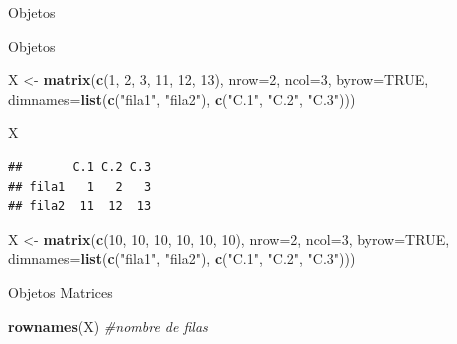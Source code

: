 \documentclass[
  ignorenonframetext,
]{beamer}
\newenvironment{Shaded}{\begin{snugshade}}{\end{snugshade}}
\newcommand{\AttributeTok}[1]{\textcolor[rgb]{0.13,0.29,0.53}{#1}}
\newcommand{\CommentTok}[1]{\textcolor[rgb]{0.56,0.35,0.01}{\textit{#1}}}
\newcommand{\ConstantTok}[1]{\textcolor[rgb]{0.56,0.35,0.01}{#1}}
\newcommand{\DecValTok}[1]{\textcolor[rgb]{0.00,0.00,0.81}{#1}}
\newcommand{\FunctionTok}[1]{\textcolor[rgb]{0.13,0.29,0.53}{\textbf{#1}}}
\newcommand{\NormalTok}[1]{#1}
\newcommand{\OtherTok}[1]{\textcolor[rgb]{0.56,0.35,0.01}{#1}}
\newcommand{\StringTok}[1]{\textcolor[rgb]{0.31,0.60,0.02}{#1}}
\begin{document}
\begin{frame}[fragile]{Objetos}
\begin{block}{Objetos}
\begin{Shaded}
\begin{Highlighting}[]
\NormalTok{X }\OtherTok{\textless{}{-}} \FunctionTok{matrix}\NormalTok{(}\FunctionTok{c}\NormalTok{(}\DecValTok{1}\NormalTok{, }\DecValTok{2}\NormalTok{, }\DecValTok{3}\NormalTok{, }\DecValTok{11}\NormalTok{, }\DecValTok{12}\NormalTok{, }\DecValTok{13}\NormalTok{), }\AttributeTok{nrow=}\DecValTok{2}\NormalTok{, }\AttributeTok{ncol=}\DecValTok{3}\NormalTok{, }\AttributeTok{byrow=}\ConstantTok{TRUE}\NormalTok{, }
            \AttributeTok{dimnames=}\FunctionTok{list}\NormalTok{(}\FunctionTok{c}\NormalTok{(}\StringTok{"fila1"}\NormalTok{, }\StringTok{"fila2"}\NormalTok{), }\FunctionTok{c}\NormalTok{(}\StringTok{"C.1"}\NormalTok{, }\StringTok{"C.2"}\NormalTok{, }\StringTok{"C.3"}\NormalTok{)))}

\NormalTok{X}
\end{Highlighting}
\end{Shaded}

\begin{verbatim}
##       C.1 C.2 C.3
## fila1   1   2   3
## fila2  11  12  13
\end{verbatim}

\begin{Shaded}
\begin{Highlighting}[]
\NormalTok{X }\OtherTok{\textless{}{-}} \FunctionTok{matrix}\NormalTok{(}\FunctionTok{c}\NormalTok{(}\DecValTok{10}\NormalTok{, }\DecValTok{10}\NormalTok{, }\DecValTok{10}\NormalTok{, }\DecValTok{10}\NormalTok{, }\DecValTok{10}\NormalTok{, }\DecValTok{10}\NormalTok{), }\AttributeTok{nrow=}\DecValTok{2}\NormalTok{, }\AttributeTok{ncol=}\DecValTok{3}\NormalTok{, }\AttributeTok{byrow=}\ConstantTok{TRUE}\NormalTok{, }
            \AttributeTok{dimnames=}\FunctionTok{list}\NormalTok{(}\FunctionTok{c}\NormalTok{(}\StringTok{"fila1"}\NormalTok{, }\StringTok{"fila2"}\NormalTok{), }\FunctionTok{c}\NormalTok{(}\StringTok{"C.1"}\NormalTok{, }\StringTok{"C.2"}\NormalTok{, }\StringTok{"C.3"}\NormalTok{)))}
\end{Highlighting}
\end{Shaded}
\end{block}

\begin{block}{Objetos \textbar{} Matrices}
\protect\hypertarget{objetos-matrices}{}
\begin{Shaded}
\begin{Highlighting}[]
\FunctionTok{rownames}\NormalTok{(X) }\CommentTok{\#nombre de filas}
\end{Highlighting}
\end{Shaded}


\end{block}
\end{frame}
\end{document}
